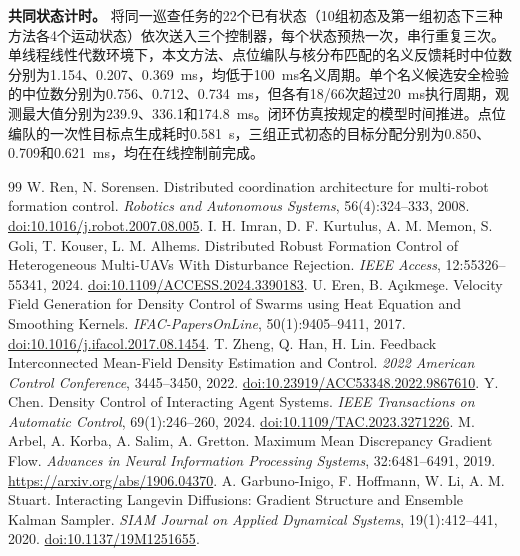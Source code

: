 \documentclass[UTF8,a4paper,11pt,fontset=none]{ctexart}
\begin{document}
\smallskip\noindent\textbf{共同状态计时。}
将同一巡查任务的22个已有状态（10组初态及第一组初态下三种方法各4个运动状态）依次送入三个控制器，每个状态预热一次，串行重复三次。单线程线性代数环境下，本文方法、点位编队与核分布匹配的名义反馈耗时中位数分别为1.154、0.207、0.369~ms，均低于100~ms名义周期。单个名义候选安全检验的中位数分别为0.756、0.712、0.734~ms，但各有18/66次超过20~ms执行周期，观测最大值分别为239.9、336.1和174.8~ms。闭环仿真按规定的模型时间推进。点位编队的一次性目标点生成耗时0.581~s，三组正式初态的目标分配分别为0.850、0.709和0.621~ms，均在在线控制前完成。
\FloatBarrier

\begin{thebibliography}{99}\footnotesize
\setlength{\itemsep}{2pt}\setlength{\parskip}{0pt}
 W. Ren, N. Sorensen. Distributed coordination architecture for multi-robot formation control.
\emph{Robotics and Autonomous Systems}, 56(4):324--333, 2008.
\href{https://doi.org/10.1016/j.robot.2007.08.005}{doi:10.1016/j.robot.2007.08.005}.
 I. H. Imran, D. F. Kurtulus, A. M. Memon, S. Goli, T. Kouser, L. M. Alhems.
Distributed Robust Formation Control of Heterogeneous Multi-UAVs With Disturbance Rejection.
\emph{IEEE Access}, 12:55326--55341, 2024.
\href{https://doi.org/10.1109/ACCESS.2024.3390183}{doi:10.1109/ACCESS.2024.3390183}.
 U. Eren, B. Açıkmeşe.
Velocity Field Generation for Density Control of Swarms using Heat Equation and Smoothing Kernels.
\emph{IFAC-PapersOnLine}, 50(1):9405--9411, 2017.
\href{https://doi.org/10.1016/j.ifacol.2017.08.1454}{doi:10.1016/j.ifacol.2017.08.1454}.
 T. Zheng, Q. Han, H. Lin.
Feedback Interconnected Mean-Field Density Estimation and Control.
\emph{2022 American Control Conference}, 3445--3450, 2022.
\href{https://doi.org/10.23919/ACC53348.2022.9867610}{doi:10.23919/ACC53348.2022.9867610}.
 Y. Chen. Density Control of Interacting Agent Systems.
\emph{IEEE Transactions on Automatic Control}, 69(1):246--260, 2024.
\href{https://doi.org/10.1109/TAC.2023.3271226}{doi:10.1109/TAC.2023.3271226}.
 M. Arbel, A. Korba, A. Salim, A. Gretton.
Maximum Mean Discrepancy Gradient Flow.
\emph{Advances in Neural Information Processing Systems}, 32:6481--6491, 2019.
\url{https://arxiv.org/abs/1906.04370}.
 A. Garbuno-Inigo, F. Hoffmann, W. Li, A. M. Stuart.
Interacting Langevin Diffusions: Gradient Structure and Ensemble Kalman Sampler.
\emph{SIAM Journal on Applied Dynamical Systems}, 19(1):412--441, 2020.
\href{https://doi.org/10.1137/19M1251655}{doi:10.1137/19M1251655}.

\end{thebibliography}
\end{document}
